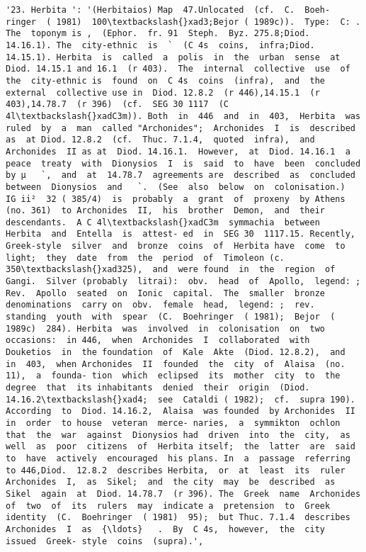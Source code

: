 \documentclass[11pt]{article}
\begin{document}
\begin{Verbatim}[commandchars=\\\{\}]
         '23. Herbita ': '(Herbitaios) Map  47.Unlocated  (cf.  C.  Boeh- ringer  ( 1981)  100\textbackslash{}xad3;Bejor ( 1989c)).  Type:  C: .  The  toponym is ,  (Ephor.  fr. 91  Steph.  Byz. 275.8;Diod.  14.16.1). The  city-ethnic  is  `  (C 4s  coins,  infra;Diod. 14.15.1). Herbita  is  called  a  polis  in  the  urban  sense  at  Diod. 14.15.1 and 16.1  (r 403).  The  internal  collective  use  of  the  city-ethnic is  found  on  C 4s  coins  (infra),  and  the  external  collective use in  Diod. 12.8.2  (r 446),14.15.1  (r 403),14.78.7  (r 396)  (cf.  SEG 30 1117  (C 4l\textbackslash{}xadC3m)). Both  in  446  and  in  403,  Herbita  was  ruled  by  a  man  called "Archonides";  Archonides  I  is  described  as  at Diod. 12.8.2  (cf.  Thuc. 7.1.4,  quoted  infra),  and  Archonides  II as at  Diod. 14.16.1.  However,  at  Diod. 14.16.1  a peace  treaty  with  Dionysios  I  is  said  to  have  been  concluded by µ   `,  and  at  14.78.7  agreements are  described  as  concluded  between  Dionysios  and   `.  (See  also  below  on  colonisation.)  IG ii²  32 ( 385/4)  is  probably  a  grant  of  proxeny  by Athens  (no. 361)  to Archonides  II,  his  brother  Demon,  and  their  descendants.  A C 4l\textbackslash{}xadC3m  symmachia  between  Herbita  and  Entella  is  attest- ed  in  SEG 30  1117.15. Recently,  Greek-style  silver  and  bronze  coins  of  Herbita have  come  to  light;  they  date  from  the  period  of  Timoleon (c. 350\textbackslash{}xad325),  and  were found  in  the  region  of  Gangi.  Silver (probably  litrai):  obv.  head  of  Apollo,  legend: ; Rev.  Apollo  seated  on  Ionic  capital.  The  smaller  bronze denominations  carry on  obv.  female  head,  legend: ;  rev.  standing  youth  with  spear  (C.  Boehringer  ( 1981);  Bejor  ( 1989c)  284). Herbita  was  involved  in  colonisation  on  two  occasions:  in 446,  when  Archonides  I  collaborated  with  Douketios  in  the foundation  of  Kale  Akte  (Diod. 12.8.2),  and  in  403,  when Archonides  II  founded  the  city  of  Alaisa  (no. 11),  a  founda- tion  which  eclipsed  its  mother  city  to  the  degree  that  its inhabitants  denied  their  origin  (Diod. 14.16.2\textbackslash{}xad4;  see  Cataldi ( 1982);  cf.  supra 190).  According  to  Diod. 14.16.2,  Alaisa  was founded  by Archonides  II  in  order  to house  veteran  merce- naries,  a  symmikton  ochlon  that  the  war  against  Dionysios had  driven  into  the  city,  as  well  as  poor  citizens  of  Herbita itself;  the  latter  are  said  to  have  actively  encouraged  his plans. In  a  passage  referring  to 446,Diod.  12.8.2  describes Herbita,  or  at  least  its  ruler  Archonides  I,  as  Sikel;  and  the city  may  be  described  as  Sikel  again  at  Diod. 14.78.7  (r 396). The  Greek  name  Archonides  of  two  of  its  rulers  may  indicate a  pretension  to  Greek  identity  (C.  Boehringer  ( 1981)  95);  but Thuc. 7.1.4  describes  Archonides  I  as  {\ldots}   .  By  C 4s,  however,  the  city  issued  Greek- style  coins  (supra).',

\end{Verbatim}
\end{document}
